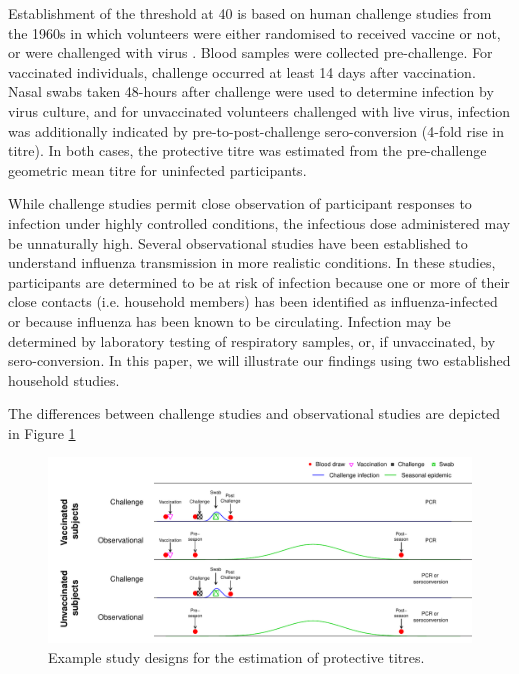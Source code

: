 Establishment of the threshold at 40 is based on human challenge studies from the 1960s in which volunteers were either randomised to received vaccine or not, or were challenged with virus \citep{Hobson;1972}. Blood samples were collected pre-challenge. For vaccinated individuals, challenge occurred at least 14 days after vaccination. Nasal swabs taken 48-hours after challenge were used to determine infection by virus culture, and for unvaccinated volunteers challenged with live virus, infection was additionally indicated by pre-to-post-challenge sero-conversion (4-fold rise in titre). In both cases, the protective titre was estimated from the pre-challenge geometric mean titre for uninfected participants.

While challenge studies permit close observation of participant responses to infection under highly controlled conditions, the infectious dose administered may be unnaturally high. Several observational studies have been established to understand influenza transmission in more realistic conditions. In these studies, participants are determined to be at risk of infection because one or more of their close contacts (i.e. household members) has been identified as influenza-infected or because influenza has been known to be circulating.  Infection may be determined by laboratory testing of respiratory samples, or, if unvaccinated, by sero-conversion. In this paper, we will illustrate our findings using two established household studies.

The differences between challenge studies and observational studies are depicted in Figure \ref{fig:study-design}

\begin{figure}[htp]
    \centering
    \includegraphics[width=\linewidth]{../fig-studies/fig-studies.pdf}
    \caption{\footnotesize
        Example study designs for the estimation of protective titres.
    }
    \label{fig:study-design}
\end{figure}
